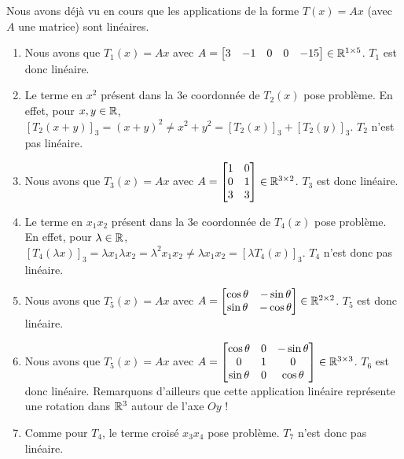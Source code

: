 \begin{exercice}
Nous avons déjà vu en cours que les applications de la forme $T(x) = Ax$ (avec $A$ une matrice) sont linéaires. 
\begin{enumerate}
    \item Nous avons que $T_1 (x) = Ax$ avec $A = 
    \begin{bmatrix} 3 & -1 & 0 & 0 & -15 \end{bmatrix} \in \mathbb{R}^{1 \times 5}$. $T_1$ est donc linéaire.
    
    \item Le terme en $x^2$ présent dans la 3e coordonnée de $T_2 (x)$ pose problème. En effet, pour $x,y \in \mathbb{R}$, $[T_2 (x+y)]_3 = (x+y)^2 \neq x^2 + y^2 = [T_2 (x)]_3 + [T_2 (y)]_3$. $T_2$ n'est pas linéaire.
    
    \item Nous avons que $T_3 (x) = Ax$ avec $A = \begin{bmatrix} 1 & 0 \\ 0 & 1 \\ 3 & 3 \end{bmatrix} \in \mathbb{R}^{3 \times 2}$. $T_3$ est donc linéaire. 
    
    \item Le terme en $x_1 x_2$ présent dans la 3e coordonnée de $T_4 (x)$ pose problème. En effet, pour $\lambda \in \mathbb{R}$, $[T_4 (\lambda x)]_3 = \lambda x_1 \lambda x_2 = \lambda^2 x_1 x_2 \neq \lambda x_1 x_2 = [\lambda T_4 (x)]_3$. $T_4$ n'est donc pas linéaire.
    
    \item Nous avons que $T_5 (x) = Ax$ avec $A = \begin{bmatrix} \cos\theta & -\sin\theta \\ \sin\theta & -\cos\theta \end{bmatrix} \in \mathbb{R}^{2 \times 2}$. $T_5$ est donc linéaire.
    
    \item Nous avons que $T_5 (x) = Ax$ avec $A = 
    \begin{bmatrix}
    \cos\theta & 0 & -\sin\theta \\
    0 & 1 & 0 \\
    \sin\theta & 0 & \cos\theta \end{bmatrix} \in \mathbb{R}^{3 \times 3}$. $T_6$ est donc linéaire. Remarquons d'ailleurs que cette application linéaire représente une rotation dans $\mathbb{R}^3$ autour de l'axe $Oy$ !
    
    \item Comme pour $T_4$, le terme croisé $x_3 x_4$ pose problème. $T_7$ n'est donc pas linéaire.
    

\end{enumerate}
\end{exercice}
